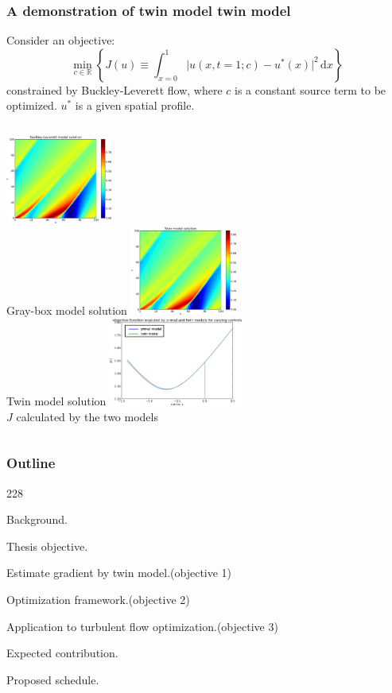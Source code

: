 \documentclass{beamer}
\let\oldcite=\cite
\renewcommand{\cite}[1]{\textcolor[rgb]{.4,.4,.85}{\oldcite{#1}}}
\newcommand{\barrow}{\item[\color{darkred}\ding{228}]}
\begin{document}
\begin{frame}
    \frametitle{A demonstration of twin model \hfill \scriptsize{twin model}}\small
    Consider an objective: \scriptsize \cite{Kucuk 06}\vspace{-.2cm}\small
    $$
        \min_{c\in\mathbb{R}} \left\{ J(u) \equiv \int_{x=0}^1 \big|u(x,t=1;c) - u^*(x)\big|^2 \,\textrm{d}x\right\}
    $$
    constrained by Buckley-Leverett flow, where $c$ is a constant source term to be optimized.
    $u^*$ is a given spatial profile.\\\vspace{.2cm}
    \scriptsize
    \begin{columns}
         \centering
            \includegraphics[width=3.5cm]{leftcol.png}\\
            Gray-box model solution
         \centering
            \includegraphics[width=3.5cm]{Twin_sol_30.png}\\
            Twin model solution
         \centering
            \includegraphics[width=4.4cm]{J_twin_vs_primal.png}\\
            $J$ calculated by the two models
    \end{columns}
\end{frame}


\begin{frame}
    \frametitle{Outline}\small
    \begin{dinglist}{228}
        \barrow {} Background.
        \barrow Thesis objective.
        \vspace{.35cm}
        \barrow Estimate gradient by twin model.\hfill(objective 1)
        \barrow Optimization framework.\hfill(objective 2)
        \barrow Application to turbulent flow optimization.\hfill(objective 3)
        \vspace{.35cm}
        \barrow Expected contribution.
        \barrow Proposed schedule.
    \end{dinglist}
\end{frame}
\end{document}
